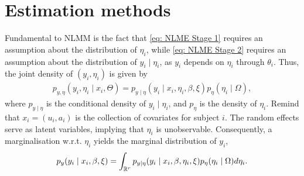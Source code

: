 \section{Estimation methods} \label{sec: Estimation methods}

Fundamental to NLMM is the fact that \eqref{eq: NLME Stage 1} requires an assumption about the distribution of $\eta_i$, while \eqref{eq: NLME Stage 2} requires an assumption about the distribution of $y_i \mid \eta_i$, as $y_i$ depends on $\eta_i$ through $\theta_i$. Thus, the joint density of $(y_i, \eta_i)$ is given by
\begin{align*}
    p_{y,\eta}(y_i,\eta_i\mid x_i,\Theta)=p_{y\mid \eta}(y_i\mid x_i,\eta_i,\beta,\xi)p_\eta(\eta_i\mid \Omega),
\end{align*}
where $p_{y\mid  \eta}$ is the conditional density of $y_i \mid \eta_i$, and $p_\eta$ is the density of $\eta_i$. Remind that $x_i =(u_i,a_i)$ is the collection of covariates for subject $i$. The random effects serve as latent variables, implying that $\eta_i$ is unobservable. Consequently, a marginalisation w.r.t. $\eta_i$ yields the marginal distribution of $y_i$,
\begin{align}
    p_y(y_i\mid x_i,\beta,\xi)=\int_{\mathbb{R}^r} p_{y\mid \eta}(y_i\mid x_i,\beta,\eta_i,\xi)p_\eta(\eta_i\mid  \Omega)d\eta_i. \label{eq: marginal distribution of y_i}
\end{align}


